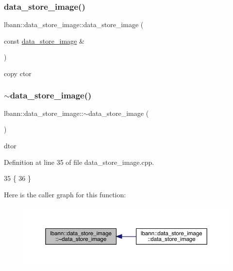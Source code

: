 \subsubsection{\texorpdfstring{data\+\_\+store\+\_\+image()}{data\_store\_image()}\hspace{0.1cm}{\footnotesize\ttfamily [2/2]}}
{\footnotesize\ttfamily lbann\+::data\+\_\+store\+\_\+image\+::data\+\_\+store\+\_\+image (\begin{DoxyParamCaption}\item[{const \hyperlink{classlbann_1_1data__store__image}{data\+\_\+store\+\_\+image} \&}]{ }\end{DoxyParamCaption})\hspace{0.3cm}{\ttfamily [default]}}



copy ctor 

\mbox{\label{classlbann_1_1data__store__image_a1c6e508be9cbadcd63f79f2e2c24dba8}} 
\subsubsection{\texorpdfstring{$\sim$data\+\_\+store\+\_\+image()}{~data\_store\_image()}}
{\footnotesize\ttfamily lbann\+::data\+\_\+store\+\_\+image\+::$\sim$data\+\_\+store\+\_\+image (\begin{DoxyParamCaption}{ }\end{DoxyParamCaption})\hspace{0.3cm}{\ttfamily [override]}}



dtor 



Definition at line 35 of file data\+\_\+store\+\_\+image.\+cpp.


\begin{DoxyCode}
35                                     \{
36 \}
\end{DoxyCode}
Here is the caller graph for this function\+:\nopagebreak
\begin{figure}[H]
\begin{center}
\leavevmode
\includegraphics[width=350pt]{classlbann_1_1data__store__image_a1c6e508be9cbadcd63f79f2e2c24dba8_icgraph}
\end{center}
\end{figure}


